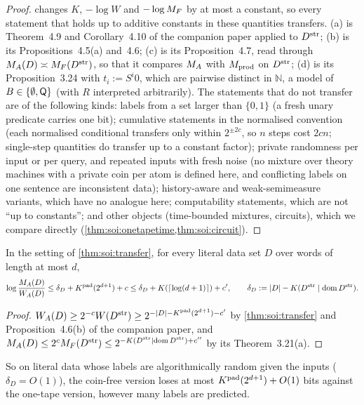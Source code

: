 \begin{proof}
 changes $K$, $-\log W$ and $-\log M_{F}$ by at most a constant, so every statement that holds up to additive constants in these quantities transfers. (a) is Theorem~4.9 and Corollary~4.10 of the companion paper applied to $D^{\rm str}$; (b) is its Propositions~4.5(a) and~4.6; (c) is its Proposition~4.7, read through $M_{A}(D)\asymp M_{F}(D^{\rm str})$, so that it compares $M_{A}$ with $M_{\mathrm{prod}}$ on $D^{\rm str}$; (d) is its Proposition~3.24 with $t_i:=S^i0$, which are pairwise distinct in $\mathbb N$, a model of $B\in\{\emptyset,\mathsf{Q}\}$ (with $R$ interpreted arbitrarily). The statements that do not transfer are of the following kinds: labels from a set larger than $\{0,1\}$ (a fresh unary predicate carries one bit); cumulative statements in the normalised convention (each normalised conditional transfers only within $2^{\pm2c}$, so $n$ steps cost $2cn$; single-step quantities do transfer up to a constant factor); private randomness per input or per query, and repeated inputs with fresh noise (no mixture over theory machines with a private coin per atom is defined here, and conflicting labels on one sentence are inconsistent data); history-aware and weak-semimeasure variants, which have no analogue here; computability statements, which are not ``up to constants''; and other objects (time-bounded mixtures, circuits), which we compare directly (\cref{thm:soi:onetapetime,thm:soi:circuit}).
\end{proof}

\begin{proposition}\label{prop:soi:price}
In the setting of \cref{thm:soi:transfer}, for every literal data set $D$ over words of length at most $d$,
\[
\log\frac{M_{A}(D)}{W_{A}(D)}\le\delta_D+K^{\mathrm{pad}}(2^{d+1})+c\le\delta_D+K(\lceil\log(d+1)\rceil)+c',\qquad\delta_D:=\lvert D\rvert-K(D^{\rm str}\mid\operatorname{dom} D^{\rm str}).
\]
\end{proposition}

\begin{proof}
$W_{A}(D)\ge2^{-c}W(D^{\rm str})\ge2^{-\lvert D\rvert-K^{\mathrm{pad}}(2^{d+1})-c'}$ by \cref{thm:soi:transfer} and Proposition~4.6(b) of the companion paper, and $M_{A}(D)\le2^cM_{F}(D^{\rm str})\le2^{-K(D^{\rm str}\mid\operatorname{dom} D^{\rm str})+c''}$ by its Theorem~3.21(a).
\end{proof}

So on literal data whose labels are algorithmically random given the inputs ($\delta_D=O(1)$), the coin-free version loses at most $K^{\mathrm{pad}}(2^{d+1})+O(1)$ bits against the one-tape version, however many labels are predicted.

